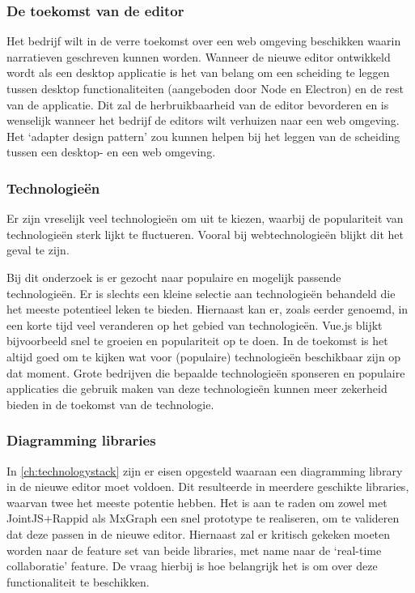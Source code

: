 \subsubsection{De toekomst van de editor}
Het bedrijf wilt in de verre toekomst over een web omgeving beschikken waarin narratieven geschreven kunnen worden. Wanneer de nieuwe editor ontwikkeld wordt als een desktop applicatie is het van belang om een scheiding te leggen tussen desktop functionaliteiten (aangeboden door Node en Electron) en de rest van de applicatie. Dit zal de herbruikbaarheid van de editor bevorderen en is wenselijk wanneer het bedrijf de editors wilt verhuizen naar een web omgeving. Het ‘adapter design pattern’ zou kunnen helpen bij het leggen van de scheiding tussen een desktop- en een web omgeving.

\subsubsection{Technologieën}
Er zijn vreselijk veel technologieën om uit te kiezen, waarbij de populariteit van technologieën sterk lijkt te fluctueren. Vooral bij webtechnologieën blijkt dit het geval te zijn.

Bij dit onderzoek is er gezocht naar populaire en mogelijk passende technologieën. Er is slechts een kleine selectie aan technologieën behandeld die het meeste potentieel leken te bieden. Hiernaast kan er, zoals eerder genoemd, in een korte tijd veel veranderen op het gebied van technologieën. Vue.js blijkt bijvoorbeeld snel te groeien en populariteit op te doen. In de toekomst is het altijd goed om te kijken wat voor (populaire) technologieën beschikbaar zijn op dat moment. Grote bedrijven die bepaalde technologieën sponseren en populaire applicaties die gebruik maken van deze technologieën kunnen meer zekerheid bieden in de toekomst van de technologie.

\subsubsection{Diagramming libraries}
In \autoref{ch:technologystack} zijn er eisen opgesteld waaraan een diagramming library in de nieuwe editor moet voldoen. Dit resulteerde in meerdere geschikte libraries, waarvan twee het meeste potentie hebben. Het is aan te raden om zowel met JointJS+Rappid als MxGraph een snel prototype te realiseren, om te valideren dat deze passen in de nieuwe editor. Hiernaast zal er kritisch gekeken moeten worden naar de feature set van beide libraries, met name naar de ‘real-time collaboratie’ feature. De vraag hierbij is hoe belangrijk het is om over deze functionaliteit te beschikken.

